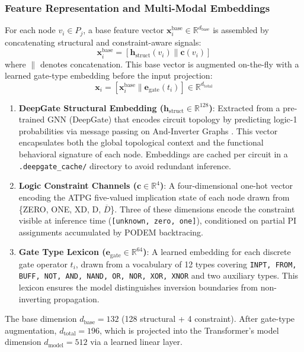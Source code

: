 \documentclass[conference]{IEEEtran}
\begin{document}
\subsubsection{Feature Representation and Multi-Modal Embeddings}
For each node $v_i \in P_j$, a base feature vector $\mathbf{x}_i^{\text{base}} \in \mathbb{R}^{d_{\text{base}}}$ is assembled by concatenating structural and constraint-aware signals:
\begin{equation}
   \mathbf{x}_i^{\text{base}} = [\mathbf{h}_{\text{struct}}(v_i) \parallel \mathbf{c}(v_i)]
\end{equation}
where $\parallel$ denotes concatenation. This base vector is augmented on-the-fly with a learned gate-type embedding before the input projection:
\begin{equation}
   \mathbf{x}_i = [\mathbf{x}_i^{\text{base}} \parallel \mathbf{e}_{\text{gate}}(t_i)] \in \mathbb{R}^{d_{\text{total}}}
\end{equation}
\begin{enumerate}
   \item \textbf{DeepGate Structural Embedding ($\mathbf{h}_{\text{struct}} \in \mathbb{R}^{128}$)}: Extracted from a pre-trained GNN (DeepGate) that encodes circuit topology by predicting logic-1 probabilities via message passing on And-Inverter Graphs \cite{deepgate}. This vector encapsulates both the global topological context and the functional behavioral signature of each node. Embeddings are cached per circuit in a \texttt{.deepgate\_cache/} directory to avoid redundant inference.
   \item \textbf{Logic Constraint Channels ($\mathbf{c} \in \mathbb{R}^{4}$)}: A four-dimensional one-hot vector encoding the ATPG five-valued implication state of each node drawn from \{ZERO, ONE, XD, D, $\overline{D}$\}. Three of these dimensions encode the constraint visible at inference time (\texttt{[unknown, zero, one]}), conditioned on partial PI assignments accumulated by PODEM backtracing.
   \item \textbf{Gate Type Lexicon ($\mathbf{e}_{\text{gate}} \in \mathbb{R}^{64}$)}: A learned embedding for each discrete gate operator $t_i$, drawn from a vocabulary of 12 types covering \texttt{INPT, FROM, BUFF, NOT, AND, NAND, OR, NOR, XOR, XNOR} and two auxiliary types. This lexicon ensures the model distinguishes inversion boundaries from non-inverting propagation.
\end{enumerate}
The base dimension $d_{\text{base}} = 132$ (128 structural + 4 constraint). After gate-type augmentation, $d_{\text{total}} = 196$, which is projected into the Transformer's model dimension $d_{\text{model}} = 512$ via a learned linear layer.
\end{document}

